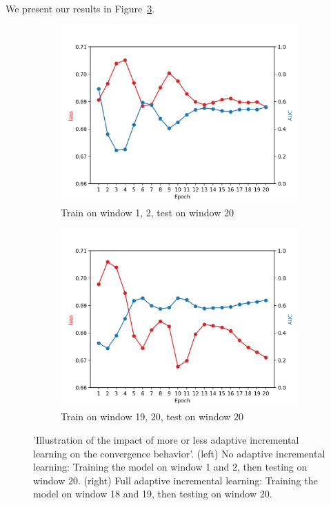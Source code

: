 We present our results in Figure~\ref{fig:comparison_concept_drift}.
% 
\begin{figure}[htbp!]
     \centering
     \begin{subfigure}[b]{0.49\textwidth}
         \centering
         \includegraphics[width=\textwidth]{images/evaluation/Figure_1and2pureTrain.png}
         \caption{Train on window 1, 2, test on window 20}
         \label{fig:train_1_2_test_20}
     \end{subfigure}
     \hfill
     \begin{subfigure}[b]{0.49\textwidth}
         \centering
         \includegraphics[width=\textwidth]{images/evaluation/Figure_18and19pureTrain.png}
         \caption{Train on window 19, 20, test on window 20}
         \label{fig:train_18_19_test_20}
     \end{subfigure}
    \caption{'Illustration of the impact of more or less adaptive incremental learning on the convergence behavior'.
    (left) No adaptive incremental learning: Training the model on window 1 and 2, then testing on window 20.
    (right) Full adaptive incremental learning: Training the model on window 18 and 19, then testing on window 20.}
    \label{fig:comparison_concept_drift}
\end{figure}


